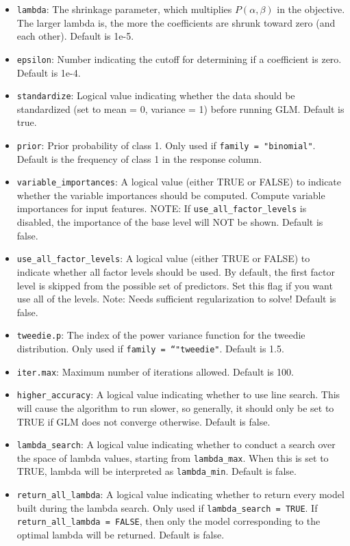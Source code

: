 \documentclass[11pt]{article}
\begin{document}
\begin{itemize}
\item \texttt{lambda}: The shrinkage parameter, which multiplies $P(\alpha,\beta)$ in the objective. The larger lambda is, the more the coefficients are shrunk toward zero (and each other). Default is 1e-5.
\item \texttt{epsilon}: Number indicating the cutoff for determining if a coefficient is zero. Default is 1e-4.
\item \texttt{standardize}: Logical value indicating whether the data should be standardized (set to mean = 0, variance = 1) before running GLM. Default is true.
\item \texttt{prior}: Prior probability of class 1. Only used if \texttt{family = "binomial"}. Default is the frequency of class 1 in the response column. 
\item \texttt{variable\_importances}: A logical value (either TRUE or FALSE) to indicate whether the variable importances should be computed.  Compute variable importances for input features. NOTE: If \texttt{use\_all\_factor\_levels} is disabled,  the importance of the base level will NOT be shown. Default is false.
\item \texttt{use\_all\_factor\_levels}: A logical value (either TRUE or FALSE) to indicate whether all factor levels should be used. By default, the first factor level is skipped from the possible set of predictors. Set this flag if you want use all of the levels. Note: Needs sufficient regularization to solve! Default is false.
\item \texttt{tweedie.p}: The index of the power variance function for the tweedie distribution. Only used if \texttt{family = “"tweedie"}. Default is 1.5.
\item \texttt{iter.max}: Maximum number of iterations allowed. Default is 100.
\item \texttt{higher\_accuracy}: A logical value indicating whether to use line search. This will cause the algorithm to run slower, so generally, it should only be set to TRUE if GLM does not converge otherwise. Default is false.
\item \texttt{lambda\_search}: A logical value indicating whether to conduct a search over the space of lambda values, starting from \texttt{lambda\_max}. When this is set to TRUE, lambda will be interpreted as \texttt{lambda\_min}. Default is false.
\item \texttt{return\_all\_lambda}: A logical value indicating whether to return every model built during the lambda search. Only used if \texttt{lambda\_search = TRUE}. If \texttt{return\_all\_lambda = FALSE}, then only the model corresponding to the optimal lambda will be returned. Default is false.

\end{itemize}
\end{document}
